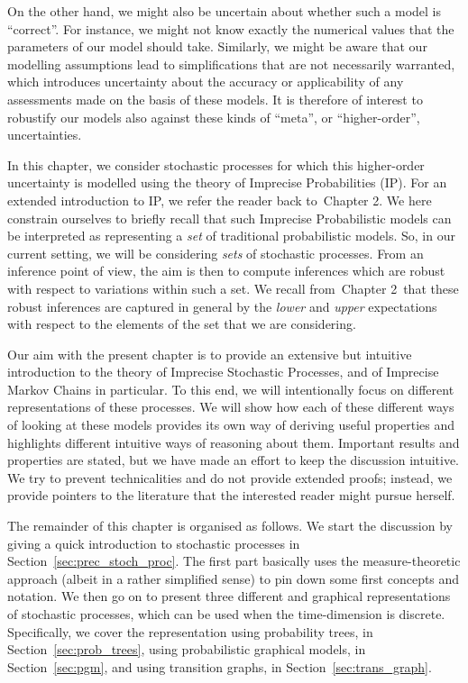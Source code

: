 \documentclass[graybox]{svmult}
\def\refIPChapter{Chapter 2}
\begin{document}
On the other hand, we might also be uncertain about whether such a model is ``correct''. For instance, we might not know exactly the numerical values that the parameters of our model should take. Similarly, we might be aware that our modelling assumptions lead to simplifications that are not necessarily warranted, which introduces uncertainty about the accuracy or applicability of any assessments made on the basis of these models. It is therefore of interest to robustify our models also against these kinds of ``meta'', or ``higher-order'', uncertainties.

In this chapter, we consider stochastic processes for which this higher-order uncertainty is modelled using the theory of Imprecise Probabilities (IP). For an extended introduction to IP, we refer the reader back to~\refIPChapter. We here constrain ourselves to briefly recall that such Imprecise Probabilistic models can be interpreted as representing a \emph{set} of traditional probabilistic models. So, in our current setting, we will be considering \emph{sets} of stochastic processes. From an inference point of view, the aim is then to compute inferences which are robust with respect to variations within such a set. We recall from~\refIPChapter~that these robust inferences are captured in general by the \emph{lower} and \emph{upper} expectations with respect to the elements of the set that we are considering.

Our aim with the present chapter is to provide an extensive but intuitive introduction to the theory of Imprecise Stochastic Processes, and of Imprecise Markov Chains in particular. To this end, we will intentionally focus on different representations of these processes. We will show how each of these different ways of looking at these models provides its own way of deriving useful properties and highlights different intuitive ways of reasoning about them. Important results and properties are stated, but we have made an effort to keep the discussion intuitive. We try to prevent technicalities and do not provide extended proofs; instead, we provide pointers to the literature that the interested reader might pursue herself.

The remainder of this chapter is organised as follows. We start the discussion by giving a quick introduction to stochastic processes in Section~\ref{sec:prec_stoch_proc}. The first part basically uses the measure-theoretic approach (albeit in a rather simplified sense) to pin down some first concepts and notation. We then go on to present three different and graphical representations of stochastic processes, which can be used when the time-dimension is discrete. Specifically, we cover the representation using probability trees, in Section~\ref{sec:prob_trees}, using probabilistic graphical models, in Section~\ref{sec:pgm}, and using transition graphs, in Section~\ref{sec:trans_graph}.
\end{document}
